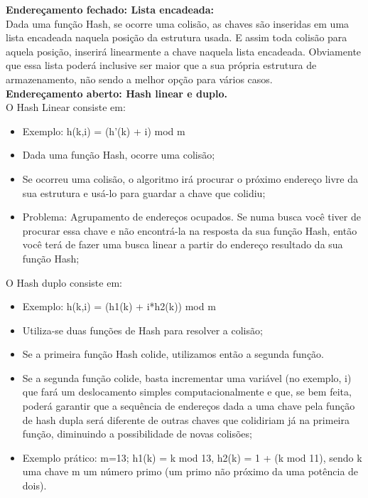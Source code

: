 \documentclass{article}
\begin{document}
\textbf{Endereçamento fechado: Lista encadeada:}\\
Dada uma função Hash, se ocorre uma colisão, as chaves são inseridas em uma lista encadeada naquela
posição da estrutura usada. E assim toda colisão para aquela posição, inserirá linearmente a chave
naquela lista encadeada. Obviamente que essa lista poderá inclusive ser maior que a sua própria
estrutura de armazenamento, não sendo a melhor opção para vários casos.\\

\textbf{Endereçamento aberto: Hash linear e duplo.}\\

O Hash Linear consiste em:

\begin{itemize}
   \item Exemplo: h(k,i) = (h'(k) + i) mod m
   \item Dada uma função Hash, ocorre uma colisão;
   \item Se ocorreu uma colisão, o algoritmo irá procurar o próximo endereço livre da sua estrutura
e usá-lo para guardar a chave que colidiu;
   \item Problema: Agrupamento de endereços ocupados. Se numa busca você tiver de procurar essa
chave e não encontrá-la na resposta da sua função Hash, então você terá de fazer uma busca linear a
partir do endereço resultado da sua função Hash;
\end{itemize}

O Hash duplo consiste em:

\begin{itemize}
   \item Exemplo: h(k,i) = (h1(k) + i*h2(k)) mod m
   \item Utiliza-se duas funções de Hash para resolver a colisão;
   \item Se a primeira função Hash colide, utilizamos então a segunda função.
   \item Se a segunda função colide, basta incrementar uma variável (no exemplo, i) que fará um deslocamento simples
computacionalmente e que, se bem feita, poderá garantir que a sequência de endereços dada a uma
chave pela função de hash dupla será diferente de outras chaves que colidiriam já na primeira
função, diminuindo a possibilidade de novas colisões;
   \item Exemplo prático: m=13; h1(k) = k mod 13, h2(k) = 1 + (k mod 11), sendo k uma chave m um
número primo (um primo não próximo da uma potência de dois).

\end{itemize}
\end{document}
